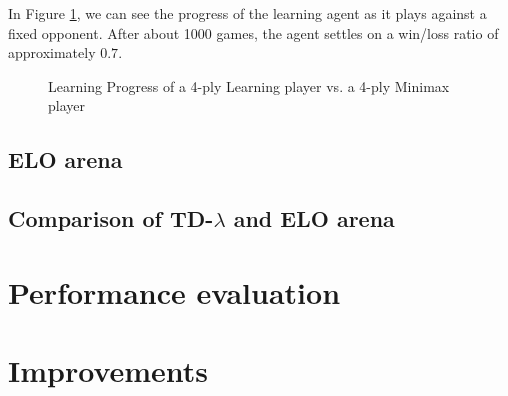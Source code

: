 \documentclass[11pt,twocolumn]{article}
\newcommand{\tdl}{TD-$\lambda$ }
\begin{document}
In Figure \ref{LearningProgress}, we can see the progress of the learning agent as it plays against a fixed opponent. After about 1000 games, the agent settles on a win/loss ratio of approximately $0.7$.
\begin{figure}[H]
    \caption{Learning Progress of a 4-ply Learning player vs. a 4-ply Minimax player}
    \label{LearningProgress}
\end{figure}
\clearpage
\subsection{ELO arena}
\subsection{Comparison of \tdl and ELO arena}
\section{Performance evaluation}
\section{Improvements}




\end{document}
